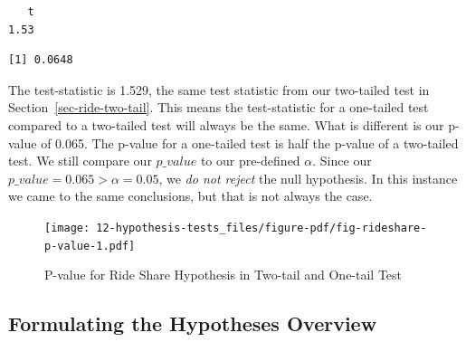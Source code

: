 \documentclass[
  letterpaper,
  DIV=11,
  numbers=noendperiod]{scrreprt}
\newenvironment{Shaded}{\begin{snugshade}}{\end{snugshade}}
\newcommand{\AttributeTok}[1]{\textcolor[rgb]{0.40,0.45,0.13}{#1}}
\newcommand{\FloatTok}[1]{\textcolor[rgb]{0.68,0.00,0.00}{#1}}
\newcommand{\FunctionTok}[1]{\textcolor[rgb]{0.28,0.35,0.67}{#1}}
\newcommand{\NormalTok}[1]{\textcolor[rgb]{0.00,0.23,0.31}{#1}}
\newcommand{\OtherTok}[1]{\textcolor[rgb]{0.00,0.23,0.31}{#1}}
\newcommand{\SpecialCharTok}[1]{\textcolor[rgb]{0.37,0.37,0.37}{#1}}
\newcommand{\StringTok}[1]{\textcolor[rgb]{0.13,0.47,0.30}{#1}}
\theoremstyle{definition}
\theoremstyle{remark}
\begin{document}
\begin{Shaded}
\end{Shaded}

\begin{verbatim}
   t 
1.53 
\end{verbatim}

\begin{Shaded}
\end{Shaded}

\begin{verbatim}
[1] 0.0648
\end{verbatim}

The test-statistic is 1.529, the same test statistic from our two-tailed
test in Section~\ref{sec-ride-two-tail}. This means the test-statistic
for a one-tailed test compared to a two-tailed test will always be the
same. What is different is our p-value of 0.065. The p-value for a
one-tailed test is half the p-value of a two-tailed test. We still
compare our \(p\_value\) to our pre-defined \(\alpha\). Since our
\(p\_value = 0.065 > \alpha = 0.05\), we \emph{do not reject} the null
hypothesis. In this instance we came to the same conclusions, but that
is not always the case.

\begin{figure}

{\centering \texttt{[image: 12-hypothesis-tests\_files/figure-pdf/fig-rideshare-p-value-1.pdf]}

}

\caption{\label{fig-rideshare-p-value}P-value for Ride Share Hypothesis
in Two-tail and One-tail Test}

\end{figure}

\hypertarget{formulating-the-hypotheses-overview}{%
\subsection{Formulating the Hypotheses
Overview}\label{formulating-the-hypotheses-overview}}
\end{document}

